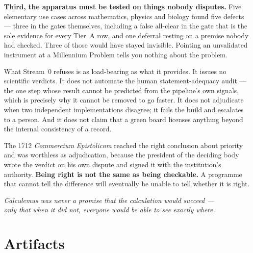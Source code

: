 \documentclass[11pt,a4paper]{article}
\begin{document}
\textbf{Third, the apparatus must be tested on things nobody disputes.} Five elementary use cases
across mathematics, physics and biology found five defects — three in the gates themselves,
including a false all-clear in the gate that is the sole evidence for every Tier~A row, and one
deferral resting on a premise nobody had checked. Three of those would have stayed invisible.
Pointing an unvalidated instrument at a Millennium Problem tells you nothing about the problem.

What Stream~0 refuses is as load-bearing as what it provides. It issues no scientific verdicts.
It does not automate the human statement-adequacy audit — the one step whose result cannot be
predicted from the pipeline's own signals, which is precisely why it cannot be removed to go
faster. It does not adjudicate when two independent implementations disagree; it fails the build
and escalates to a person. And it does not claim that a green board licenses anything beyond the
internal consistency of a record.

The 1712 \emph{Commercium Epistolicum} reached the right conclusion about priority and was
worthless as adjudication, because the president of the deciding body wrote the verdict on his
own dispute and signed it with the institution's authority. \textbf{Being right is not the same
as being checkable.} A programme that cannot tell the difference will eventually be unable to
tell whether it is right.

\vspace{1em}
\begin{center}\itshape
Calculemus was never a promise that the calculation would succeed —\\
only that when it did not, everyone would be able to see exactly where.
\end{center}

\appendix
\section{Artifacts}
\end{document}
